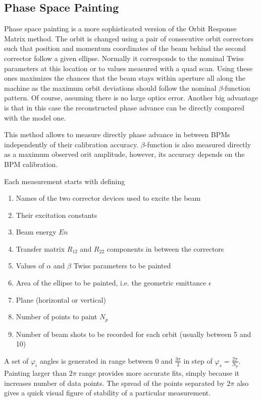 \subsection{Phase Space Painting}

Phase space painting is a more sophisticated version of the Orbit Response Matrix method. 
The orbit is changed using a pair of consecutive orbit correctors such that 
position and momentum coordinates of the beam behind the second corrector follow a given ellipse. 
Normally it corresponds to the nominal Twiss parameters at this location or 
to values measured with a quad scan. 
Using these ones maximizes the chances that the beam stays within aperture all along 
the machine as the maximum orbit deviations should follow the nominal $\beta$-function pattern. 
Of course, assuming there is no large optics error. 
Another big advantage is that in this case the reconstructed phase advance can be 
directly compared with the model one. 

This method allows to measure directly phase advance in between BPMs 
independently of their calibration accuracy.  
$\beta$-function is also measured directly as a maximum observed orit amplitude, however, 
its accuracy depends on the BPM calibration.

Each measurement starts with defining 
\begin{enumerate}[nosep]
\item Names of the two corrector devices used to excite the beam
\item Their excitation constants
\item Beam energy $En$
\item Transfer matrix $R_{12}$ and $R_{22}$ components in between the correctors
\item Values of $\alpha$ and $\beta$ Twiss parameters to be painted
\item Area of the ellipse to be painted, i.e. the geometric emittance $\epsilon$
\item Plane (horizontal or vertical)
\item Number of points to paint $N_p$ 
\item Number of beam shots to be recorded for each orbit (usually between 5 and 10)
\end{enumerate}
A set of $\varphi_i$ angles is generated in range between $0$ and $\frac{3\pi}{2}$ 
in step of $\varphi_s = \frac{2\pi}{N_p}$.
Painting larger than $2\pi$ range provides more accurate fits, simply because it increases number of data points.
The spread of the points separated by $2\pi$ also gives a quick visual figure of stability of a particular measurement. 

